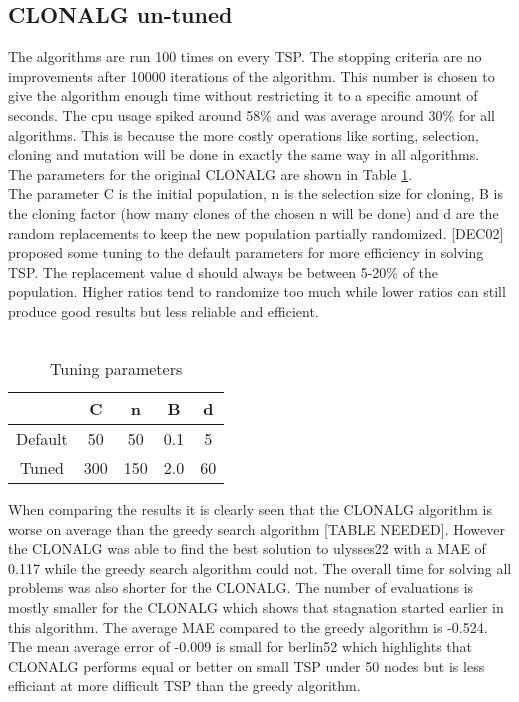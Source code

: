 \subsection{CLONALG un-tuned}
The algorithms are run 100 times on every TSP. The stopping criteria are no improvements after 10000 iterations of the algorithm. This number is chosen to give the algorithm enough time without restricting it to a specific amount of seconds. The cpu usage spiked around 58\% and was average around 30\% for all algorithms. This is because the more costly operations like sorting, selection, cloning and mutation will be done in exactly the same way in all algorithms.\\
The parameters for the original CLONALG are shown in Table \ref{tuning}.\\
The parameter C is the initial population, n is the selection size for cloning, B is the cloning factor (how many clones of the chosen n will be done) and d are the random replacements to keep the new population partially randomized. [DEC02] proposed some tuning to the default parameters for more efficiency in solving TSP. The replacement value d should always be between 5-20\% of the population. Higher ratios tend to randomize too much while lower ratios can still produce good results but less reliable and efficient.\\\\
\begin{table}[H C]
	\begin{tabular}{|c|c|c|c|c|}
		\hline
		& C   & n   & B   & d  \\ \hline
		Default & 50  & 50  & 0.1 & 5  \\ \hline
		Tuned   & 300 & 150 & 2.0 & 60 \\ \hline
	\end{tabular}
	\caption{Tuning parameters}
	\label{tuning}
\end{table} 
When comparing the results it is clearly seen that the CLONALG algorithm is worse on average than the greedy search algorithm [TABLE NEEDED]. However the CLONALG was able to find the best solution to ulysses22 with a MAE of 0.117 while the greedy search algorithm could not. The overall time for solving all problems was also shorter for the CLONALG. The number of evaluations is mostly smaller for the CLONALG which shows that stagnation started earlier in this algorithm. The average MAE compared to the greedy algorithm is -0.524. The mean average error of -0.009 is small for berlin52 which highlights that CLONALG performs equal or better on small TSP under 50 nodes but is less efficiant at more difficult TSP than the greedy algorithm.
